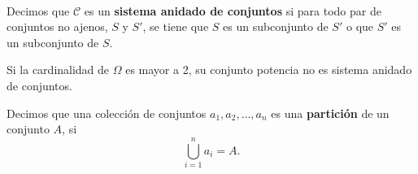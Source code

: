 \begin{dfn} \label{conj2} \cite{Todo} \\
Decimos que $\mathcal{C}$ es un \textbf{sistema anidado de conjuntos} si para todo par de conjuntos no ajenos, $S$ y $S'$, 
se tiene que $S$ es un subconjunto de $S'$ o que $S'$ es un subconjunto de $S$.
\end{dfn}

\begin{obs}
Si la cardinalidad de $\Omega$ es mayor a 2, su conjunto potencia no es sistema anidado de conjuntos.
\end{obs}

\begin{dfn}
Decimos que una colección de conjuntos $a_1,a_2,\dots,a_n$ es una \textbf{partición} de un conjunto $A$, si $$\bigcup\limits_{i=1}^{n}a_i=A.$$ 
\end{dfn}